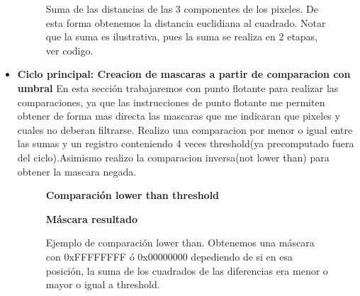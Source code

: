\begin{itemize}
\begin{figure}[!ht]
              \caption{Suma de las distancias de las 3 componentes de los pixeles. De esta forma obtenemos la distancia euclidiana al cuadrado. Notar que la suma es ilustrativa, pues la suma se realiza en 2 etapas, ver codigo.} 
        \end{figure}

        \newpage
  \item \textbf{Ciclo principal: Creacion de mascaras a partir de comparacion con umbral}
        En esta sección trabajaremos con punto flotante para realizar las comparaciones, ya que las instrucciones de punto flotante me permiten obtener de forma mas directa las mascaras que me indicaran que pixeles y cuales no deberan filtrarse. Realizo una comparacion por menor o igual entre las sumas y un registro conteniendo 4 veces threshold(ya precomputado fuera del ciclo).Asimismo realizo la comparacion inversa(not lower than) para obtener la mascara negada.

 \begin{figure}[!ht]
              \centering
              \par      
              \textbf{Comparación lower than threshold}
              \bigskip
              \par  
              \textbf{Máscara resultado}
              \par      
              \bigskip
              \caption{Ejemplo de comparación lower than. Obtenemos una máscara con 0xFFFFFFFF ó 0x00000000 depediendo de si
              en esa posición, la suma de los cuadrados de las diferencias era menor o mayor o igual a threshold.} 
        \end{figure}


\end{itemize}
